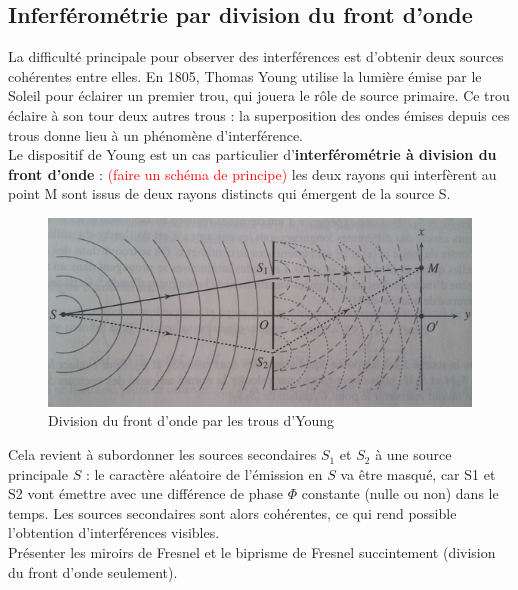 \documentclass[11pt,a4paper]{report}
\begin{document}
\newpage
\subsection{Inferférométrie par division du front d'onde}

La difficulté principale pour observer des interférences est d'obtenir deux sources cohérentes entre elles. En 1805, Thomas Young utilise la lumière émise par le Soleil pour éclairer un premier trou, qui jouera le rôle de source primaire. Ce trou éclaire à son tour deux autres trous : la superposition des ondes émises depuis ces trous donne lieu à un phénomène d'interférence.\\

Le dispositif de Young est un cas particulier d'\textbf{interférométrie à division du front d'onde} : \textcolor{red}{(faire un schéma de principe)} les deux rayons qui interfèrent au point M sont issus de deux rayons distincts qui émergent de la source S.

\begin{figure}[h!]
	\begin{center}
		\includegraphics[scale = 0.5]{division.png}
	\end{center}
	\caption{Division du front d'onde par les trous d'Young}
\end{figure}

Cela revient à subordonner les sources secondaires $S_1$ et $S_2$ à une source principale $S$ : le caractère aléatoire de l'émission en $S$ va être masqué, car S1 et S2 vont émettre avec une différence de phase $\Phi$ constante (nulle ou non) dans le temps. Les sources secondaires sont alors cohérentes, ce qui rend possible l'obtention d'interférences visibles.\\

Présenter les miroirs de Fresnel et le biprisme de Fresnel succintement (division du front d'onde seulement). 
\end{document}
